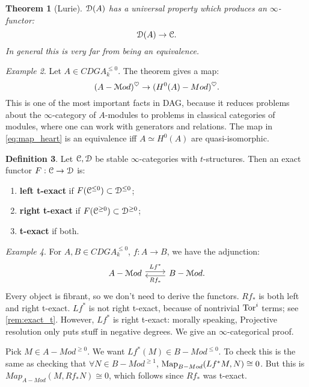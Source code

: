 \documentclass[10pt,a4paper,reqno,oneside]{book} %
\theoremstyle{plain}
\newtheorem{thm}{Theorem}[section]
\theoremstyle{definition}
\newtheorem{defin}[thm]{Definition}
\theoremstyle{remark}
\newtheorem{eg}[thm]{Example}
\numberwithin{equation}{section}
\begin{document}
\begin{thm}[Lurie]
$\mathcal D(A)$ has a universal property which produces an $\infty$-functor:
\[	\mathcal D(A) \to \mathcal C.	\]
In general this is very far from being an equivalence.
\end{thm}

\begin{eg}
Let $A \in CDGA^{\leq 0}_k$. The theorem gives a map:
\begin{equation}
\label{eq:map_heart}
	(A-\mathcal M od)^{\heartsuit} \to  (H^0(A)-Mod)^{\heartsuit}.
\end{equation}
This is one of the most important facts
in DAG, because it reduces problems about the $\infty$-category of $A$-modules to problems in classical categories of modules,
where one can work with generators and relations. The map in \ref{eq:map_heart} is an equivalence iff $A \simeq H^0(A)$ 
are quasi-isomorphic.
\end{eg}

\begin{defin}
Let $\mathcal C, \mathcal D$ be stable $\infty$-categories with $t$-structures. Then an exact functor $F : \mathcal C \to \mathcal D$ is:
\begin{enumerate}
\item \textbf{left t-exact} if $F(\mathcal C^{\leq 0}) \subset \mathcal D^{\leq 0}$;
\item \textbf{right t-exact} if $F(\mathcal C^{\geq 0}) \subset \mathcal D^{\geq 0}$;
\item \textbf{t-exact} if both.
\end{enumerate}
\end{defin}

\begin{eg}
\label{eg:modules_t_exact}
For $A,B \in CDGA_k^{\leq 0}$, $f:A \to B$, we have the adjunction:
\[
\begin{tikzcd}
A-\cM od\arrow[shift left]{r}{Lf^*} & B-\cM od\arrow[shift left]{l}{Rf_*}.
\end{tikzcd}
\] 
Every object is fibrant, so we don't need to
derive the functors. $Rf_*$ is both left and right t-exact. $Lf^*$ is not right t-exact, because of nontrivial $\mathrm{Tor}^i$
terms; see \ref{rem:exact_t}. However, $Lf^*$ is right t-exact: 
morally speaking, Projective resolution only puts stuff in negative degrees. We give an $\infty$-categorical proof.

Pick $M \in A-Mod^{\geq 0}$. We want $Lf^*(M) \in B-Mod^{\leq 0}$. To check this is the same as checking that
$\forall N \in B-Mod^{\geq 1}$, $\operatorname{Map}_{B-Mod}(Lf^*M,N) \cong 0$. But this is $Map_{A-Mod}(M,Rf_*N) \cong 0$, which
follows since $Rf_*$ was t-exact.
\end{eg}
\end{document}
